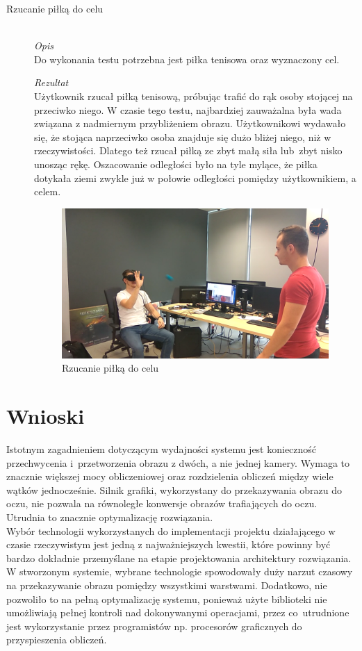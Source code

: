 \documentclass[a4paper,11pt,twoside]{report}
\theoremstyle{definition}
\begin{document}
\begin{description}
\item[Rzucanie piłką do celu] \hfill \\
\textit{Opis} \\
Do wykonania testu potrzebna jest piłka tenisowa oraz wyznaczony cel. 

\textit{Rezultat} \\
Użytkownik rzucał piłką tenisową, próbując trafić do rąk osoby stojącej na przeciwko niego. W czasie tego testu, najbardziej zauważalna była wada związana z nadmiernym przybliżeniem obrazu. Użytkownikowi wydawało się, że stojąca naprzeciwko osoba znajduje się dużo bliżej niego, niż w rzeczywistości. Dlatego też rzucał piłką ze zbyt małą siła lub~zbyt nisko unosząc rękę. Oszacowanie odległości było na tyle mylące, że piłka dotykała ziemi zwykle już w połowie odległości pomiędzy użytkownikiem, a celem.

\begin{figure}[H]
\centering
\includegraphics[scale=0.18]{images/rzucaniePilki}
\caption[ThrowingTest]{Rzucanie piłką do celu}
\end{figure}

\end{description}

\section{Wnioski}

Istotnym zagadnieniem dotyczącym wydajności systemu jest konieczność przechwycenia i~przetworzenia obrazu z dwóch, a nie jednej kamery. Wymaga to znacznie większej mocy obliczeniowej oraz rozdzielenia obliczeń między wiele wątków jednocześnie. Silnik grafiki, wykorzystany do przekazywania obrazu do oczu, nie pozwala na równoległe konwersje obrazów trafiających do oczu. Utrudnia to znacznie optymalizację rozwiązania. \\
Wybór technologii wykorzystanych do implementacji projektu działającego w czasie rzeczywistym jest jedną z najważniejszych kwestii, które powinny być bardzo dokładnie przemyślane na etapie projektowania architektury rozwiązania. W stworzonym systemie, wybrane technologie spowodowały duży narzut czasowy na przekazywanie obrazu pomiędzy wszystkimi warstwami. Dodatkowo, nie pozwoliło to na pełną optymalizację systemu, ponieważ użyte biblioteki nie umożliwiają pełnej kontroli nad dokonywanymi operacjami, przez co~utrudnione jest wykorzystanie przez programistów np. procesorów graficznych do przyspieszenia obliczeń.
\end{document}
